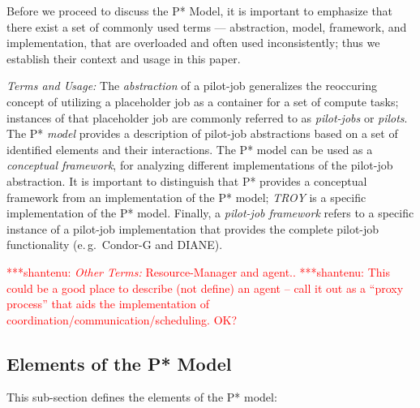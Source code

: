 \documentclass[conference,final]{IEEEtran}
\newcommand{\jhanote}[1]{ {\textcolor{red} { ***shantenu: #1 }}}
\newcommand{\jhanote}[1]{}
\newcommand{\upp}{\vspace*{-0.5em}}
\begin{document}
Before we proceed to discuss the P* Model, it is important to
emphasize that there exist a set of commonly used terms ---
abstraction, model, framework, and implementation, that are overloaded
and often used inconsistently; thus we establish their context and
usage in this paper.

\emph{Terms and Usage:} The \emph{ abstraction} of a pilot-job
generalizes the reoccuring concept of utilizing a placeholder job as a
container for a set of compute tasks; instances of that placeholder
job are commonly referred to as \emph{pilot-jobs} or \emph{pilots}.
The P* \emph{model} provides a %
description of pilot-job abstractions based on a set of identified
elements and their interactions. The P* model can be used as a {\it
  conceptual framework}, for analyzing different implementations of
the pilot-job abstraction.  It is important to distinguish that P*
provides a conceptual framework from an implementation of the P*
model; \emph{TROY} is a specific implementation of the P* model.
Finally, a \emph{pilot-job framework} refers to a specific instance of
a pilot-job implementation that provides the complete pilot-job
functionality (e.\,g.\ Condor-G and DIANE).

\jhanote{\emph{Other Terms:} Resource-Manager and agent..}
\jhanote{This could be a good place to describe (not define) an agent
  -- call it out as a ``proxy process'' that aids the implementation
  of coordination/communication/scheduling. OK?}


%

\noindent 
\subsection{Elements of the P* Model \upp\upp}
\noindent This sub-section defines the elements of the P* model:
\end{document}

